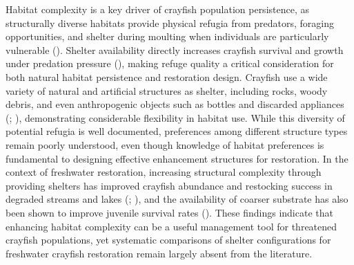 \documentclass[
  letterpaper,
  DIV=11,
  numbers=noendperiod]{scrartcl}
\begin{document}
Habitat complexity is a key driver of crayfish population persistence,
as structurally diverse habitats provide physical refugia from
predators, foraging opportunities, and shelter during moulting when
individuals are particularly vulnerable
(). Shelter
availability directly increases crayfish survival and growth under
predation pressure (), making
refuge quality a critical consideration for both natural habitat
persistence and restoration design. Crayfish use a wide variety of
natural and artificial structures as shelter, including rocks, woody
debris, and even anthropogenic objects such as bottles and discarded
appliances (;
), demonstrating considerable
flexibility in habitat use. While this diversity of potential refugia is
well documented, preferences among different structure types remain
poorly understood, even though knowledge of habitat preferences is
fundamental to designing effective enhancement structures for
restoration. In the context of freshwater restoration, increasing
structural complexity through providing shelters has improved crayfish
abundance and restocking success in degraded streams and lakes
(;
), and the
availability of coarser substrate has also been shown to improve
juvenile survival rates (). These findings indicate that enhancing habitat complexity can be
a useful management tool for threatened crayfish populations, yet
systematic comparisons of shelter configurations for freshwater crayfish
restoration remain largely absent from the literature.
\end{document}
